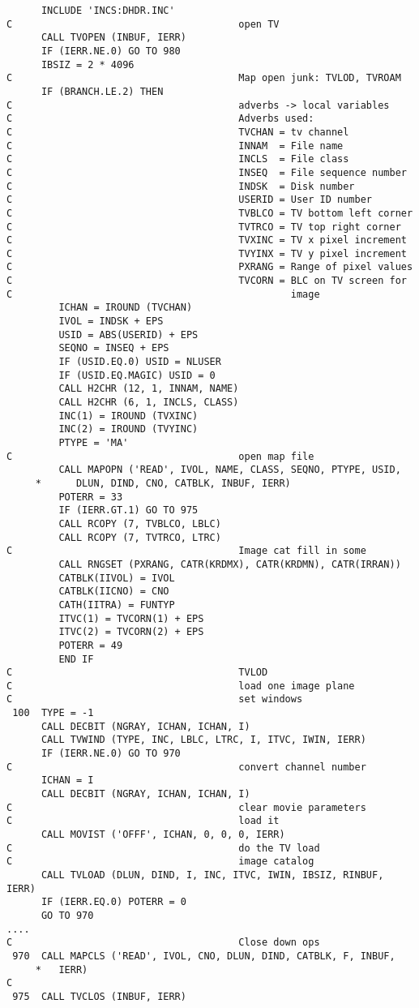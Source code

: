 \begin{verbatim}
      INCLUDE 'INCS:DHDR.INC'
C                                       open TV
      CALL TVOPEN (INBUF, IERR)
      IF (IERR.NE.0) GO TO 980
      IBSIZ = 2 * 4096
C                                       Map open junk: TVLOD, TVROAM
      IF (BRANCH.LE.2) THEN
C                                       adverbs -> local variables
C                                       Adverbs used:
C                                       TVCHAN = tv channel
C                                       INNAM  = File name
C                                       INCLS  = File class
C                                       INSEQ  = File sequence number
C                                       INDSK  = Disk number
C                                       USERID = User ID number
C                                       TVBLCO = TV bottom left corner
C                                       TVTRCO = TV top right corner
C                                       TVXINC = TV x pixel increment
C                                       TVYINX = TV y pixel increment
C                                       PXRANG = Range of pixel values
C                                       TVCORN = BLC on TV screen for
C                                                image
         ICHAN = IROUND (TVCHAN)
         IVOL = INDSK + EPS
         USID = ABS(USERID) + EPS
         SEQNO = INSEQ + EPS
         IF (USID.EQ.0) USID = NLUSER
         IF (USID.EQ.MAGIC) USID = 0
         CALL H2CHR (12, 1, INNAM, NAME)
         CALL H2CHR (6, 1, INCLS, CLASS)
         INC(1) = IROUND (TVXINC)
         INC(2) = IROUND (TVYINC)
         PTYPE = 'MA'
C                                       open map file
         CALL MAPOPN ('READ', IVOL, NAME, CLASS, SEQNO, PTYPE, USID,
     *      DLUN, DIND, CNO, CATBLK, INBUF, IERR)
         POTERR = 33
         IF (IERR.GT.1) GO TO 975
         CALL RCOPY (7, TVBLCO, LBLC)
         CALL RCOPY (7, TVTRCO, LTRC)
C                                       Image cat fill in some
         CALL RNGSET (PXRANG, CATR(KRDMX), CATR(KRDMN), CATR(IRRAN))
         CATBLK(IIVOL) = IVOL
         CATBLK(IICNO) = CNO
         CATH(IITRA) = FUNTYP
         ITVC(1) = TVCORN(1) + EPS
         ITVC(2) = TVCORN(2) + EPS
         POTERR = 49
         END IF
C                                       TVLOD
C                                       load one image plane
C                                       set windows
 100  TYPE = -1
      CALL DECBIT (NGRAY, ICHAN, ICHAN, I)
      CALL TVWIND (TYPE, INC, LBLC, LTRC, I, ITVC, IWIN, IERR)
      IF (IERR.NE.0) GO TO 970
C                                       convert channel number
      ICHAN = I
      CALL DECBIT (NGRAY, ICHAN, ICHAN, I)
C                                       clear movie parameters
C                                       load it
      CALL MOVIST ('OFFF', ICHAN, 0, 0, 0, IERR)
C                                       do the TV load
C                                       image catalog
      CALL TVLOAD (DLUN, DIND, I, INC, ITVC, IWIN, IBSIZ, RINBUF, IERR)
      IF (IERR.EQ.0) POTERR = 0
      GO TO 970
....
C                                       Close down ops
 970  CALL MAPCLS ('READ', IVOL, CNO, DLUN, DIND, CATBLK, F, INBUF,
     *   IERR)
C
 975  CALL TVCLOS (INBUF, IERR)
\end{verbatim}

